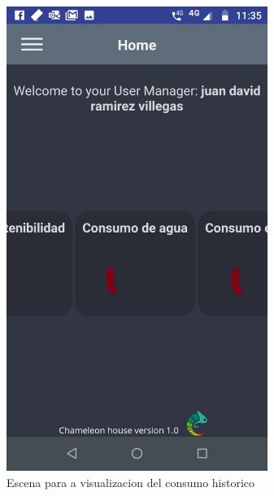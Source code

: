 \begin{enumerate}
	
	\begin{figure}[htbp]
		\centerline{\includegraphics[width=8.5cm]{./figuras/mobile_home.jpeg}}
		\caption{Escena para a visualizacion del consumo historico}
		\label{fig_14}
	\end{figure}
	

\end{enumerate}
